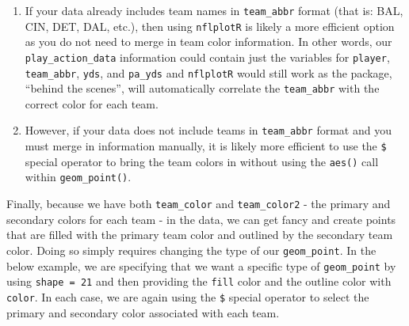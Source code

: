 \documentclass[
  letterpaper,
]{krantz}
\newenvironment{Shaded}{\begin{snugshade}}{\end{snugshade}}
\newcommand{\AttributeTok}[1]{\textcolor[rgb]{0.40,0.45,0.13}{#1}}
\newcommand{\DecValTok}[1]{\textcolor[rgb]{0.68,0.00,0.00}{#1}}
\newcommand{\FunctionTok}[1]{\textcolor[rgb]{0.28,0.35,0.67}{#1}}
\newcommand{\NormalTok}[1]{\textcolor[rgb]{0.00,0.23,0.31}{#1}}
\newcommand{\SpecialCharTok}[1]{\textcolor[rgb]{0.37,0.37,0.37}{#1}}
\providecommand{\tightlist}{%
  \setlength{\itemsep}{0pt}\setlength{\parskip}{0pt}}\usepackage{longtable,booktabs,array}
\begin{document}
\begin{enumerate}
\def\labelenumi{\arabic{enumi}.}
\tightlist
\item
  If your data already includes team names in \texttt{team\_abbr} format
  (that is: BAL, CIN, DET, DAL, etc.), then using \texttt{nflplotR} is
  likely a more efficient option as you do not need to merge in team
  color information. In other words, our \texttt{play\_action\_data}
  information could contain just the variables for \texttt{player},
  \texttt{team\_abbr}, \texttt{yds}, and \texttt{pa\_yds} and
  \texttt{nflplotR} would still work as the package, ``behind the
  scenes'', will automatically correlate the \texttt{team\_abbr} with
  the correct color for each team.
\item
  However, if your data does not include teams in \texttt{team\_abbr}
  format and you must merge in information manually, it is likely more
  efficient to use the \texttt{\$} special operator to bring the team
  colors in without using the \texttt{aes()} call within
  \texttt{geom\_point()}.
\end{enumerate}

Finally, because we have both \texttt{team\_color} and
\texttt{team\_color2} - the primary and secondary colors for each team -
in the data, we can get fancy and create points that are filled with the
primary team color and outlined by the secondary team color. Doing so
simply requires changing the type of our \texttt{geom\_point}. In the
below example, we are specifying that we want a specific type of
\texttt{geom\_point} by using \texttt{shape\ =\ 21} and then providing
the \texttt{fill} color and the outline color with \texttt{color}. In
each case, we are again using the \texttt{\$} special operator to select
the primary and secondary color associated with each team.

\begin{Shaded}
\end{Shaded}
\end{document}
